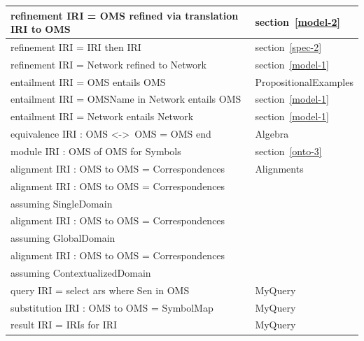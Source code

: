 \documentclass[10pt,fleqn,final]{scrreprt}
\newcommand*{\lessthan}{<}
\newcommand*{\greaterthan}{>}
\begin{document}
\begin{tabular}{|l|l|}
refinement IRI = OMS refined via translation IRI to OMS & section~\ref{model-2} \\\hline
refinement IRI = IRI then IRI & section~\ref{spec-2} \\\hline
refinement IRI = Network refined to Network & section~\ref{model-1} \\\hline
entailment IRI = OMS entails OMS & PropositionalExamples \\\hline
entailment IRI = OMSName in Network entails OMS & section~\ref{model-1}\\\hline
entailment IRI = Network entails Network & section~\ref{model-1}\\\hline
equivalence IRI : OMS \lessthan-\greaterthan\ OMS = OMS end  &  Algebra \\\hline
module IRI : OMS of OMS for Symbols  & section~\ref{onto-3} \\\hline
alignment IRI : OMS to OMS = Correspondences  & Alignments \\\hline
alignment IRI : OMS to OMS = Correspondences & \\
\qquad assuming SingleDomain & \cite{OM2014} \\\hline
alignment IRI : OMS to OMS = Correspondences & \\
\qquad assuming GlobalDomain & \cite{OM2014} \\\hline
alignment IRI : OMS to OMS = Correspondences & \\
\qquad assuming ContextualizedDomain & \cite{OM2014} \\\hline
query IRI = select ars where Sen in OMS & MyQuery\\\hline
substitution IRI : OMS to OMS = SymbolMap & MyQuery\\\hline
result IRI = IRIs for IRI & MyQuery\\\hline
\end{tabular}
\end{document}
